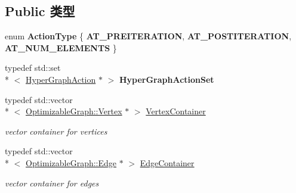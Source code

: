 \subsection*{Public 类型}
\begin{DoxyCompactItemize}
\item 
enum {\bfseries Action\-Type} \{ {\bfseries A\-T\-\_\-\-P\-R\-E\-I\-T\-E\-R\-A\-T\-I\-O\-N}, 
{\bfseries A\-T\-\_\-\-P\-O\-S\-T\-I\-T\-E\-R\-A\-T\-I\-O\-N}, 
{\bfseries A\-T\-\_\-\-N\-U\-M\-\_\-\-E\-L\-E\-M\-E\-N\-T\-S}
 \}
\item 
\hypertarget{structg2o_1_1OptimizableGraph_aa3562ad6794c36ea832095131cfffaac}{typedef std\-::set\\*
$<$ \hyperlink{classg2o_1_1HyperGraphAction}{Hyper\-Graph\-Action} $\ast$ $>$ {\bfseries Hyper\-Graph\-Action\-Set}}\label{structg2o_1_1OptimizableGraph_aa3562ad6794c36ea832095131cfffaac}

\item 
\hypertarget{structg2o_1_1OptimizableGraph_a54f01b9b6071e65e6abeebe4afb29dec}{typedef std\-::vector\\*
$<$ \hyperlink{classg2o_1_1OptimizableGraph_1_1Vertex}{Optimizable\-Graph\-::\-Vertex} $\ast$ $>$ \hyperlink{structg2o_1_1OptimizableGraph_a54f01b9b6071e65e6abeebe4afb29dec}{Vertex\-Container}}\label{structg2o_1_1OptimizableGraph_a54f01b9b6071e65e6abeebe4afb29dec}

\begin{DoxyCompactList}\small\item\em vector container for vertices \end{DoxyCompactList}\item 
\hypertarget{structg2o_1_1OptimizableGraph_a2b43e807ae6d61ef8749ca1ef7c25f62}{typedef std\-::vector\\*
$<$ \hyperlink{classg2o_1_1OptimizableGraph_1_1Edge}{Optimizable\-Graph\-::\-Edge} $\ast$ $>$ \hyperlink{structg2o_1_1OptimizableGraph_a2b43e807ae6d61ef8749ca1ef7c25f62}{Edge\-Container}}\label{structg2o_1_1OptimizableGraph_a2b43e807ae6d61ef8749ca1ef7c25f62}

\begin{DoxyCompactList}\small\item\em vector container for edges \end{DoxyCompactList}\end{DoxyCompactItemize}

